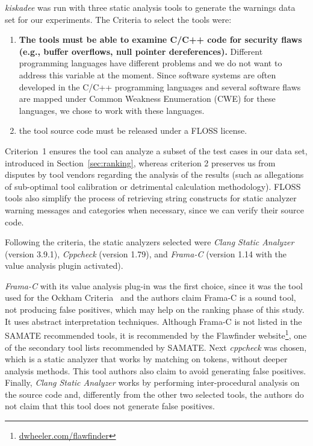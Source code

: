\textit{kiskadee} was run with three static analysis tools to generate the
warnings data set for our experiments. The Criteria to select the tools were:
\begin{enumerate}
  \item \textbf{The tools must be able to examine C/C++ code for security flaws (e.g., buffer overflows, null pointer dereferences).} Different programming languages have different problems and we do not want to address this variable at the moment. Since software systems are often developed in the C/C++ programming languages and several software flaws are mapped under Common Weakness Enumeration (CWE) for these languages, we chose to work with these languages.
  \item the tool source code must be released under a FLOSS license.
\end{enumerate}
Criterion~1 ensures the tool can analyze a subset of the test cases in our data
set, introduced in Section~\ref{sec:ranking}, whereas criterion 2 preserves us
from disputes by tool vendors regarding the analysis of the results (such as
allegations of sub-optimal tool calibration or detrimental calculation
methodology). FLOSS tools also simplify the process of retrieving string
constructs for static analyzer warning messages and categories when necessary,
since we can verify their source code.

Following the criteria, the static
analyzers selected were \emph{Clang Static Analyzer} (version 3.9.1),
\emph{Cppcheck} (version 1.79), and \emph{Frama-C} (version 1.14 with the value
analysis plugin activated).

\textit{Frama-C} with its value analysis plug-in was the first choice, since it
was the tool used for the Ockham Criteria~\cite{black_sate_2016} and the
authors claim Frama-C is a sound tool, not producing false positives, which may
help on the ranking phase of this study. It uses abstract interpretation
techniques. Although Frama-C is not listed in the SAMATE recommended tools, it
is recommended by the Flawfinder
website\footnote{\url{dwheeler.com/flawfinder}}, one of the secondary tool
lists recommended by SAMATE. Next \textit{cppcheck} was chosen, which is a
static analyzer that works by matching on tokens, without deeper analysis
methods. This tool authors also claim to avoid generating false positives.
Finally, \textit{Clang Static Analyzer} works by performing inter-procedural
analysis on the source code and, differently from the other two selected tools,
the authors do not claim that this tool does not generate false positives.

